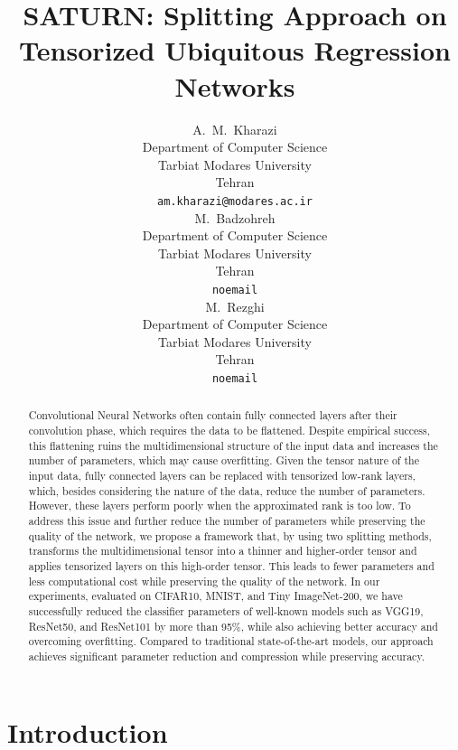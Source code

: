 \documentclass{article}
\title{SATURN: Splitting Approach on Tensorized Ubiquitous Regression Networks}
\author{%
	A.~M.~Kharazi\\
	Department of Computer Science\\
	Tarbiat Modares University\\
	Tehran \\
	\texttt{am.kharazi@modares.ac.ir} \\
	\And
	M.~Badzohreh\\
	Department of Computer Science\\
	Tarbiat Modares University\\
	Tehran \\
	\texttt{noemail} \\ %
	\And
	M.~Rezghi\\
	Department of Computer Science\\
	Tarbiat Modares University\\
	Tehran \\
	\texttt{noemail} \\ %
}
\begin{document}
\maketitle


\begin{abstract}
Convolutional Neural Networks often contain fully connected layers after their convolution phase, which requires the data to be flattened. Despite empirical success, this flattening ruins the multidimensional structure of the input data and increases the number of parameters, which may cause overfitting. Given the tensor nature of the input data, fully connected layers can be replaced with tensorized low-rank layers, which, besides considering the nature of the data, reduce the number of parameters. However, these layers perform poorly when the approximated rank is too low. To address this issue and further reduce the number of parameters while preserving the quality of the network, we propose a framework that, by using two splitting methods, transforms the multidimensional tensor into a thinner and higher-order tensor and applies tensorized layers on this high-order tensor. This leads to fewer parameters and less computational cost while preserving the quality of the network. In our experiments, evaluated on CIFAR10, MNIST, and Tiny ImageNet-200, we have successfully reduced the classifier parameters of well-known models such as VGG19, ResNet50, and ResNet101 by more than 95\%, while also achieving better accuracy and overcoming overfitting. Compared to traditional state-of-the-art models, our approach achieves significant parameter reduction and compression while preserving accuracy.
   
\end{abstract}


\section{Introduction}
\label{sec:intorduction}
\end{document}
